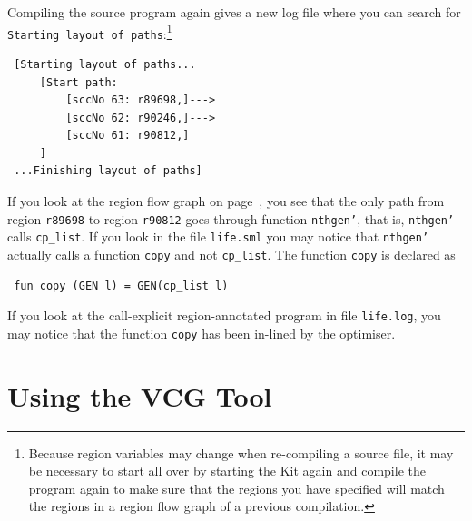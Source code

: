 \documentclass[12pt]{book}
\begin{document}
Compiling the source program again gives a new log file where you can
search for \texttt{Starting layout of paths}:\footnote{Because region
  variables may change when re-compiling a source file, it may be
  necessary to start all over by starting the Kit again and compile
  the program again to make sure that the regions you have specified
  will match the regions in a region flow graph of a previous
  compilation.}
\begin{verbatim}
 [Starting layout of paths...
     [Start path: 
         [sccNo 63: r89698,]--->
         [sccNo 62: r90246,]--->
         [sccNo 61: r90812,]
     ]
 ...Finishing layout of paths]
\end{verbatim}
If you look at the region flow graph on
page~\pageref{reg_flow_graph.ex}, you see that the only path from
region \texttt{r89698} to region \texttt{r90812} goes through function
\texttt{nthgen'}, that is, \texttt{nthgen'} calls \texttt{cp\_list}. If
you look in the file \texttt{life.sml} you may notice that
\texttt{nthgen'} actually calls a function \texttt{copy} and not
\texttt{cp\_list}. The function \texttt{copy} is declared as
\begin{verbatim}
 fun copy (GEN l) = GEN(cp_list l)
\end{verbatim}
If you look at the call-explicit region-annotated program in file
\texttt{life.log}, you may notice that the function \texttt{copy} has
been in-lined by the optimiser.

\section{Using the VCG Tool}
\end{document}
